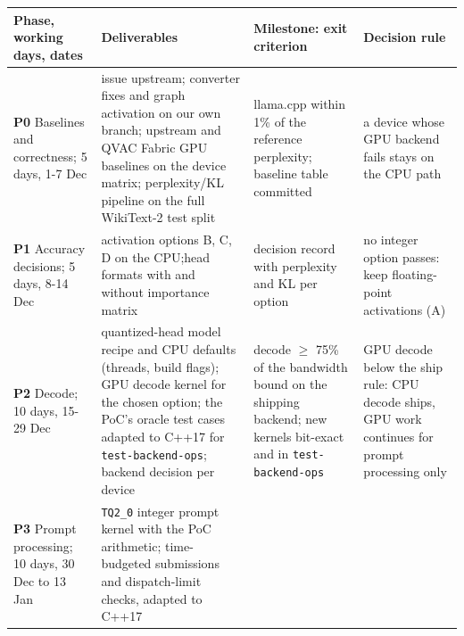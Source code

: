 \documentclass[
  10pt,
]{article}
\newcounter{none} %
\begin{document}
{\def\LTcaptype{none} %
\begin{longtable}[]{@{}
  >{\raggedright\arraybackslash}p{}
  >{\raggedright\arraybackslash}p{}
  >{\raggedright\arraybackslash}p{}
  >{\raggedright\arraybackslash}p{}@{}}
\toprule\noalign{}
\begin{minipage}[b]{\linewidth}\raggedright%
Phase, working days, dates
\end{minipage} & \begin{minipage}[b]{\linewidth}\raggedright%
Deliverables
\end{minipage} & \begin{minipage}[b]{\linewidth}\raggedright%
Milestone: exit criterion
\end{minipage} & \begin{minipage}[b]{\linewidth}\raggedright%
Decision rule
\end{minipage} \\
\midrule\noalign{}
\endhead%
\bottomrule\noalign{}
\endlastfoot%
\textbf{P0} Baselines and correctness; 5 days, 1-7 Dec & issue upstream;
converter fixes and graph activation on our own branch; upstream and
QVAC Fabric GPU baselines on the device matrix; perplexity/KL pipeline
on the full WikiText-2 test split & llama.cpp within 1\% of the
reference perplexity; baseline table committed & a device whose GPU
backend fails stays on the CPU path \\
\textbf{P1} Accuracy decisions; 5 days, 8-14 Dec & activation options B,
C, D on the CPU;\@ head formats with and without importance matrix &
decision record with perplexity and KL per option & no integer option
passes: keep floating-point activations (A) \\
\textbf{P2} Decode; 10 days, 15-29 Dec & quantized-head model recipe and
CPU defaults (threads, build flags); GPU decode kernel for the chosen
option; the PoC's oracle test cases adapted to C++17 for
\texttt{test-backend-ops}; backend decision per device & decode $\geq$
75\% of the bandwidth bound on the shipping backend; new kernels
bit-exact and in \texttt{test-backend-ops} & GPU decode below the ship
rule: CPU decode ships, GPU work continues for prompt processing only \\
\textbf{P3} Prompt processing; 10 days, 30 Dec to 13 Jan &
\texttt{TQ2\_0} integer prompt kernel with the PoC arithmetic;
time-budgeted submissions and dispatch-limit checks, adapted to C++17

\end{longtable}}
\end{document}
